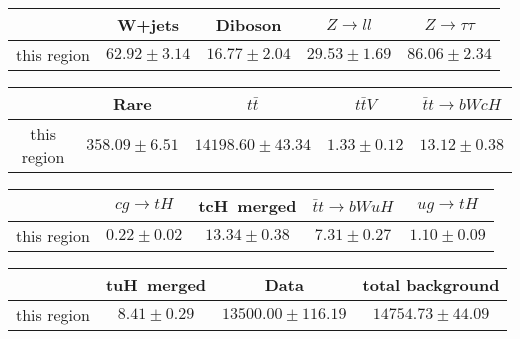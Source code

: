 \centering
\begin{tabular}{|c|c|c|c|c|} \hline
 & W+jets & Diboson & $Z\to ll$ & $Z\to \tau\tau$\\\hline
this region & $62.92\pm3.14$ & $16.77\pm2.04$ & $29.53\pm1.69$ & $86.06\pm2.34$\\\hline
\end{tabular}
\begin{tabular}{|c|c|c|c|c|} \hline
 & Rare & $t\bar{t}$ & $t\bar{t}V$ & $\bar{t}t\to bWcH$\\\hline
this region & $358.09\pm6.51$ & $14198.60\pm43.34$ & $1.33\pm0.12$ & $13.12\pm0.38$\\\hline
\end{tabular}
\begin{tabular}{|c|c|c|c|c|} \hline
 & $cg\to tH$ & tcH~merged & $\bar{t}t\to bWuH$ & $ug\to tH$\\\hline
this region & $0.22\pm0.02$ & $13.34\pm0.38$ & $7.31\pm0.27$ & $1.10\pm0.09$\\\hline
\end{tabular}
\begin{tabular}{|c|c|c|c|} \hline
 & tuH~merged & Data & total background\\\hline
this region & $8.41\pm0.29$ & $13500.00\pm116.19$ & $14754.73\pm44.09$\\\hline
\end{tabular}
